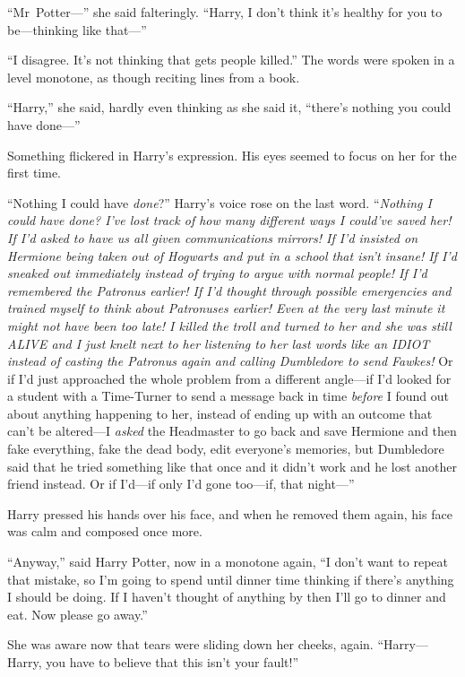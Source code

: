 “Mr~Potter—” she said falteringly. “Harry, I don’t think it’s healthy for you to be—thinking like that—”

“I disagree. It’s not thinking that gets people killed.” The words were spoken in a level monotone, as though reciting lines from a book.

“Harry,” she said, hardly even thinking as she said it, “there’s nothing you could have done—”

Something flickered in Harry’s expression. His eyes seemed to focus on her for the first time.

“Nothing I could have \emph{done}?” Harry’s voice rose on the last word. “\emph{Nothing I could have \emph{done}? I’ve lost track of how many different ways I could’ve saved her! If I’d asked to have us all given communications mirrors! If I’d insisted on Hermione being taken out of Hogwarts and put in a school that isn’t insane! If I’d sneaked out immediately instead of trying to argue with normal people! If I’d remembered the Patronus earlier! If I’d thought through possible emergencies and trained myself to think about Patronuses earlier! Even at the very last minute it might not have been too late! I killed the troll and turned to her and she was still ALIVE and I just knelt next to her listening to her last words like an IDIOT instead of casting the Patronus again and calling Dumbledore to send Fawkes!} Or if I’d just approached the whole problem from a different angle—if I’d looked for a student with a Time-Turner to send a message back in time \emph{before} I found out about anything happening to her, instead of ending up with an outcome that can’t be altered—I \emph{asked} the Headmaster to go back and save Hermione and then fake everything, fake the dead body, edit everyone’s memories, but Dumbledore said that he tried something like that once and it didn’t work and he lost another friend instead. Or if I’d—if only I’d gone too—if, that night—”

Harry pressed his hands over his face, and when he removed them again, his face was calm and composed once more.

“Anyway,” said Harry Potter, now in a monotone again, “I don’t want to repeat that mistake, so I’m going to spend until dinner time thinking if there’s anything I should be doing. If I haven’t thought of anything by then I’ll go to dinner and eat. Now please go away.”

She was aware now that tears were sliding down her cheeks, again. “Harry—Harry, you have to believe that this isn’t your fault!”

